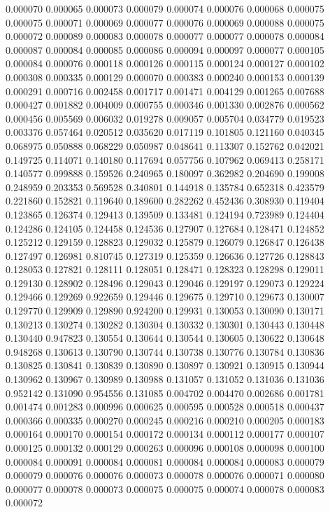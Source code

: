 0.000070
0.000065
0.000073
0.000079
0.000074
0.000076
0.000068
0.000075
0.000075
0.000071
0.000069
0.000077
0.000076
0.000069
0.000088
0.000075
0.000072
0.000089
0.000083
0.000078
0.000077
0.000077
0.000078
0.000084
0.000087
0.000084
0.000085
0.000086
0.000094
0.000097
0.000077
0.000105
0.000084
0.000076
0.000118
0.000126
0.000115
0.000124
0.000127
0.000102
0.000308
0.000335
0.000129
0.000070
0.000383
0.000240
0.000153
0.000139
0.000291
0.000716
0.002458
0.001717
0.001471
0.004129
0.001265
0.007688
0.000427
0.001882
0.004009
0.000755
0.000346
0.001330
0.002876
0.000562
0.000456
0.005569
0.006032
0.019278
0.009057
0.005704
0.034779
0.019523
0.003376
0.057464
0.020512
0.035620
0.017119
0.101805
0.121160
0.040345
0.068975
0.050888
0.068229
0.050987
0.048641
0.113307
0.152762
0.042021
0.149725
0.114071
0.140180
0.117694
0.057756
0.107962
0.069413
0.258171
0.140577
0.099888
0.159526
0.240965
0.180097
0.362982
0.204690
0.199008
0.248959
0.203353
0.569528
0.340801
0.144918
0.135784
0.652318
0.423579
0.221860
0.152821
0.119640
0.189600
0.282262
0.452436
0.308930
0.119404
0.123865
0.126374
0.129413
0.139509
0.133481
0.124194
0.723989
0.124404
0.124286
0.124105
0.124458
0.124536
0.127907
0.127684
0.128471
0.124852
0.125212
0.129159
0.128823
0.129032
0.125879
0.126079
0.126847
0.126438
0.127497
0.126981
0.810745
0.127319
0.125359
0.126636
0.127726
0.128843
0.128053
0.127821
0.128111
0.128051
0.128471
0.128323
0.128298
0.129011
0.129130
0.128902
0.128496
0.129043
0.129046
0.129197
0.129073
0.129224
0.129466
0.129269
0.922659
0.129446
0.129675
0.129710
0.129673
0.130007
0.129770
0.129909
0.129890
0.924200
0.129931
0.130053
0.130090
0.130171
0.130213
0.130274
0.130282
0.130304
0.130332
0.130301
0.130443
0.130448
0.130440
0.947823
0.130554
0.130644
0.130544
0.130605
0.130622
0.130648
0.948268
0.130613
0.130790
0.130744
0.130738
0.130776
0.130784
0.130836
0.130825
0.130841
0.130839
0.130890
0.130897
0.130921
0.130915
0.130944
0.130962
0.130967
0.130989
0.130988
0.131057
0.131052
0.131036
0.131036
0.952142
0.131090
0.954556
0.131085
0.004702
0.004470
0.002686
0.001781
0.001474
0.001283
0.000996
0.000625
0.000595
0.000528
0.000518
0.000437
0.000366
0.000335
0.000270
0.000245
0.000216
0.000210
0.000205
0.000183
0.000164
0.000170
0.000154
0.000172
0.000134
0.000112
0.000177
0.000107
0.000125
0.000132
0.000129
0.000263
0.000096
0.000108
0.000098
0.000100
0.000084
0.000091
0.000084
0.000081
0.000084
0.000084
0.000083
0.000079
0.000079
0.000076
0.000076
0.000073
0.000078
0.000076
0.000071
0.000080
0.000077
0.000078
0.000073
0.000075
0.000075
0.000074
0.000078
0.000083
0.000072

